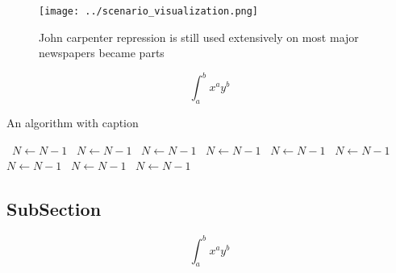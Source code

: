 \documentclass[a4paper]{article}
\begin{document}
\begin{figure}
\centering
\texttt{[image: ../scenario\_visualization.png]}
\caption{John carpenter repression is still used extensively on most major newspapers became parts
}
\end{figure}
 
\[ \int_{a}^{b}{x^{a}y^{b}} \]

\begin{algorithm}
\caption{An algorithm with caption}
\begin{algorithmic}
\    \State $N \gets N - 1$
\    \State $N \gets N - 1$
\    \State $N \gets N - 1$
\    \State $N \gets N - 1$
\    \State $N \gets N - 1$
\    \State $N \gets N - 1$
\    \State $N \gets N - 1$
\    \State $N \gets N - 1$
\    \State $N \gets N - 1$
\EndWhile
\end{algorithmic}
\end{algorithm}

\subsection{SubSection}

\[ \int_{a}^{b}{x^{a}y^{b}} \]
\end{document}
